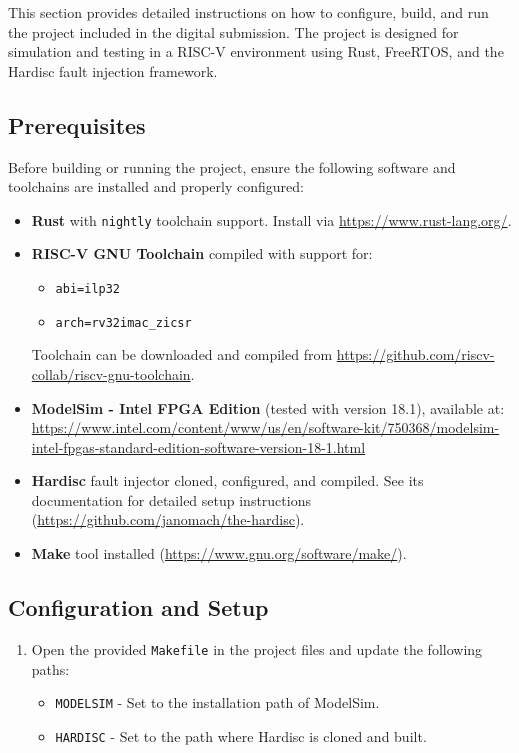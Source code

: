 \documentclass[12pt, letterpaper]{article}
\begin{document}
\begin{appendices}
This section provides detailed instructions on how to configure, build, and run the project included in the digital submission. The project is designed for simulation and testing in a RISC-V environment using Rust, FreeRTOS, and the Hardisc fault injection framework.

\subsection{Prerequisites}

Before building or running the project, ensure the following software and toolchains are installed and properly configured:

\begin{itemize}
    \item \textbf{Rust} with \texttt{nightly} toolchain support. Install via \url{https://www.rust-lang.org/}.
    \item \textbf{RISC-V GNU Toolchain} compiled with support for:
    \begin{itemize}
        \item \texttt{abi=ilp32}
        \item \texttt{arch=rv32imac\_zicsr}
    \end{itemize}
    Toolchain can be downloaded and compiled from \url{https://github.com/riscv-collab/riscv-gnu-toolchain}.
    \item \textbf{ModelSim - Intel FPGA Edition} (tested with version 18.1), available at:\\
    \url{https://www.intel.com/content/www/us/en/software-kit/750368/modelsim-intel-fpgas-standard-edition-software-version-18-1.html}
    \item \textbf{Hardisc} fault injector cloned, configured, and compiled. See its documentation for detailed setup instructions (\url{https://github.com/janomach/the-hardisc}).
    \item \textbf{Make} tool installed (\url{https://www.gnu.org/software/make/}). 
\end{itemize}

\subsection{Configuration and Setup}

\begin{enumerate}
    \item Open the provided \texttt{Makefile} in the project files and update the following paths:
    \begin{itemize}
        \item \texttt{MODELSIM} - Set to the installation path of ModelSim.
        \item \texttt{HARDISC} - Set to the path where Hardisc is cloned and built.
    \end{itemize}
    

\end{enumerate}
\end{appendices}
\end{document}
